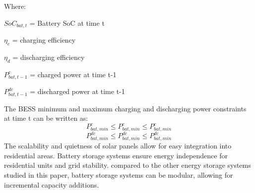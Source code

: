 Where:\par
\begin{list}{}{}
	\setlength\itemsep{-1em}
	\item $SoC_{bat,t}$ = Battery SoC at time t
	\item ${\eta_c}$ = charging efficiency
	\item ${\eta_d}$ = discharging efficiency
	\item $P^c_{bat,t-1}$ = charged power at time t-1
	\item ${P^{dc}_{bat,t-1}}$ = discharged power at time t-1
\end{list}
The BESS minimum and maximum charging and discharging power constraints at time t can be written as:
\begin{equation}
	\label{eq:powereq}
	{P^{c}_{bat,min}}\le{P^{c}_{bat,min}}\le{P^{c}_{bat,min}}
\end{equation}
\begin{equation}
	{P^{dc}_{bat,min}}\le{P^{dc}_{bat,min}}\le{P^{dc}_{bat,min}}
\end{equation}
The scalability and quietness of solar panels allow for easy integration into residential areas. Battery storage systems ensure energy independence for residential units and grid stability. compared to the other energy storage systems studied in this paper, battery storage systems can be modular, allowing for incremental capacity additions.
